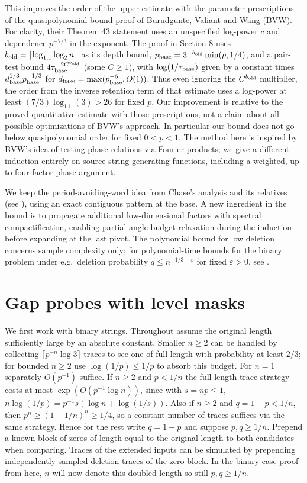 \documentclass[11pt]{article}
\begin{document}
This improves the order of the upper estimate with the parameter prescriptions
of the quasipolynomial-bound proof of Burudgunte, Valiant and Wang \cite{BVW}
(BVW). For clarity, their Theorem 43 statement uses an unspecified log-power
$c$ and dependence $p^{-7/3}$ in the exponent. The proof in Section 8 uses
$b_{\rm old}=\lceil\log_{1.1}\log_2 n\rceil$ as its depth bound,
$p_{\rm base}=3^{-b_{\rm old}}\min(p,1/4)$, and a pair-test bound
$4\tau_{\rm base}^{-2C^{b_{\rm old}}}$ (some $C\ge 1$), with
$\log(1/\tau_{\rm base})$ given by a constant times
$d_{\rm base}^{1/3}p_{\rm base}^{-1/3}$ for
$d_{\rm base}=\max(p_{\rm base}^{-6},O(1))$. Thus even ignoring the
$C^{b_{\rm old}}$ multiplier, the order from the inverse retention term of
that estimate uses a log-power at least $(7/3)\log_{1.1}(3)>26$ for fixed $p$.
Our improvement is relative to the proved quantitative estimate with those
prescriptions, not a claim about all possible optimizations of BVW's approach.
In particular our bound does not go below quasipolynomial order for fixed $0<p<1$.
The method here is inspired by BVW's idea of testing phase relations via
Fourier products; we give a different induction entirely on source-string
generating functions, including a weighted, up-to-four-factor phase argument.

We keep the period-avoiding-word idea from Chase's analysis and its relatives
(see \cite{Chase,Rub}), using an exact contiguous pattern at the base. A new
ingredient in the bound is to propagate additional low-dimensional factors
with spectral compactification, enabling partial angle-budget relaxation
during the induction before expanding at the last pivot. The polynomial bound
for low deletion concerns sample complexity only; for polynomial-time bounds
for the binary problem under e.g.\ deletion probability $q\le n^{-1/3-\varepsilon}$
for fixed $\varepsilon>0$, see \cite{CDLS}.

\section*{Gap probes with level masks}
We first work with binary strings. Throughout assume the original length
sufficiently large by an absolute constant. Smaller $n\ge2$ can be handled by
collecting $\lceil p^{-n}\log 3\rceil$ traces to see one of full length with
probability at least $2/3$; for bounded $n\ge2$ use $\log(1/p)\le1/p$ to absorb
this budget. For $n=1$ separately $O(p^{-1})$ suffice. If $n\ge2$ and $p<1/n$ the
full-length-trace strategy costs at most $\exp(O(p^{-1}\log n))$, since
with $s=np\le1$, $n\log(1/p)=p^{-1}s(\log n+\log(1/s))$. Also if $n\ge2$ and
$q=1-p<1/n$, then $p^n\ge(1-1/n)^n\ge1/4$,
so a constant number of traces suffices via the same strategy. Hence for the rest
write $q=1-p$ and suppose $p,q\ge1/n$.
Prepend a known block of zeros of length equal to the original length to both candidates when comparing. Traces of the extended inputs can be simulated by prepending independently sampled deletion traces of the zero block. In the binary-case proof from here, \(n\) will now denote this doubled length so still \(p,q\ge1/n\).
\end{document}
